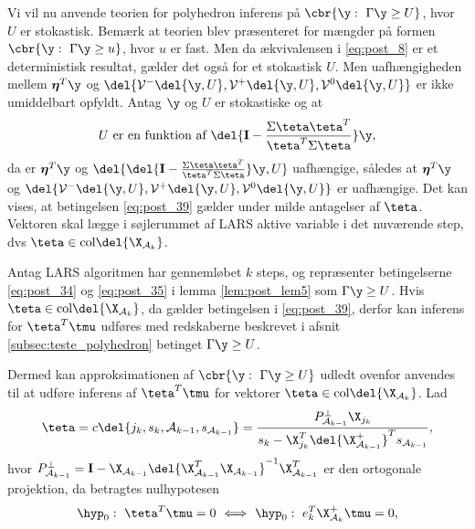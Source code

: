 Vi vil nu anvende teorien for polyhedron inferens på \(\cbr{\y: \ \Gamma \y \geq U}\), hvor \(U\) er stokastisk.
Bemærk at teorien blev præsenteret for mængder på formen \(\cbr{\y: \ \Gamma \y \geq u}\), hvor \(u\) er fast.
Men da ækvivalensen  i \eqref{eq:post_8} er et deterministisk resultat, gælder det også for et stokastisk \(U\).
Men uafhængigheden mellem \(\boldsymbol{\eta}^T \y\) og \(\del{\mathcal{V}^-\del{\y, U}, \mathcal{V}^+\del{\y, U},\mathcal{V}^0\del{\y, U}}\) er ikke umiddelbart opfyldt.
Antag \(\y\) og \(U\) er stokastiske og at
\begin{align}
U \text{ er en funktion af } \del{\mathbf{I}- \frac{\Sigma \teta \teta^T}{\teta^T \Sigma \teta}} \y, \label{eq:post_39}
\end{align}
da er \(\boldsymbol{\eta}^T \y\) og \(\del{ \del{\mathbf{I}- \frac{\Sigma \teta \teta^T}{\teta^T \Sigma \teta}} \y, U }\) uafhængige, således at \(\boldsymbol{\eta}^T \y\) og \(\del{\mathcal{V}^-\del{\y, U}, \mathcal{V}^+\del{\y, U},\mathcal{V}^0\del{\y, U}}\) er uafhængige.
Det kan vises, at betingelsen \eqref{eq:post_39} gælder under milde antagelser af \(\teta\).
Vektoren skal lægge i søjlerummet af LARS aktive variable i det nuværende step, dvs \(\teta \in \text{col} \del{\X_{\mathcal{A}_k}}\).
%
\begin{lem}
Antag LARS algoritmen har gennemløbet \(k\) steps, og repræsenter betingelserne \eqref{eq:post_34} og \eqref{eq:post_35} i lemma \ref{lem:post_lem5} som \(\Gamma \y \geq U\).
Hvis \(\teta \in \text{col} \del{\X_{\mathcal{A}_k}}\), da gælder betingelsen i \eqref{eq:post_39}, derfor kan inferens for \(\teta^T \tmu\) udføres med redskaberne beskrevet i afsnit \ref{subsec:teste_polyhedron} betinget \(\Gamma \y \geq U\).
\end{lem}
%
Dermed kan approksimationen af \(\cbr{\y : \ \Gamma \y \geq U}\) udledt ovenfor anvendes til at udføre inferens af \(\teta^T \tmu\) for vektorer \(\teta \in \text{col} \del{\X_{\mathcal{A}_k}} \).
Lad
\begin{align}
\teta = c \del{j_k, s_k, \mathcal{A}_{k-1}, s_{\mathcal{A}_{k-1}}} = \frac{P_{\mathcal{A}_{k-1}}^\perp \X_{j_{k}}}{s_k - \X_{j_{k}}^T \del{\X_{\mathcal{A}_{k-1}}^+}^T s_{\mathcal{A}_{k-1}}}, \label{eq:post_40}
\end{align}
hvor \(P_{\mathcal{A}_{k-1}}^\perp = \mathbf{I} - \X_{\mathcal{A}_{k-1}} \del{\X_{\mathcal{A}_{k-1}}^T \X_{\mathcal{A}_{k-1}}}^{-1} \X_{\mathcal{A}_{k-1}}^T\) er den ortogonale projektion, da betragtes nulhypotesen
\begin{align*}
\hyp_0: \ \teta^T \tmu = 0 \ \Longleftrightarrow \ \hyp_0: \ e_k^T \X_{\mathcal{A}_k}^+ \tmu = 0,
\end{align*}
